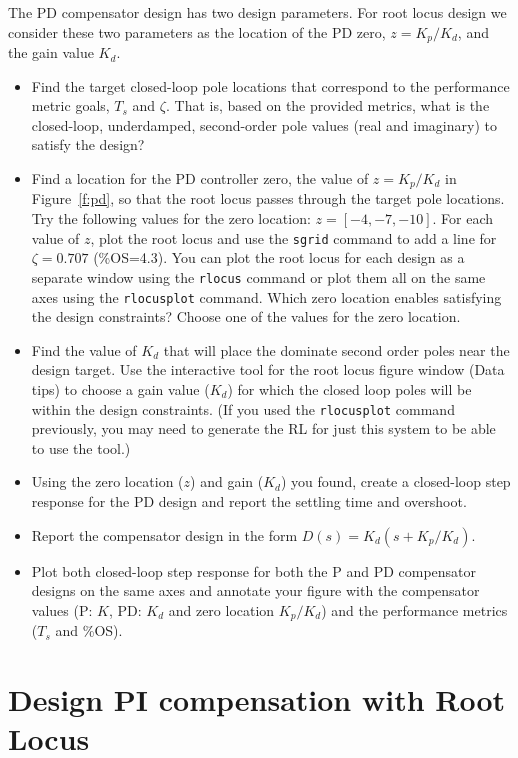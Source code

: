 \documentclass[11pt]{article}
\begin{document}
The PD compensator design has two design parameters.   For root locus design we consider these two parameters as the location of the PD zero, $z = K_p/K_d$, and the gain value $K_d$.
\begin{itemize}
\item Find the target closed-loop pole locations that correspond to the performance metric goals, $T_s$ and $\zeta$.  That is, based on the provided metrics, what is the closed-loop, underdamped, second-order pole values (real and imaginary) to satisfy the design?  
\item Find a location for the PD controller zero, the value of $z = K_p/K_d$ in Figure~\ref{f:pd}, so that the root locus passes through the target pole locations.  Try the following values for the zero location: $z = [-4, -7, -10]$.  For each value of $z$, plot the root locus and use the \texttt{sgrid} command to add a line for $\zeta=0.707$ (\%OS=4.3).  You can plot the root locus for each design as a separate window using the \texttt{rlocus} command or plot them all on the same axes using the \texttt{rlocusplot} command.  Which zero location enables satisfying the design constraints?  Choose one of the values for the zero location.
\item Find the value of $K_d$ that will place the dominate second order poles near the design target.  Use the interactive tool for the root locus figure window (Data tips) to choose a gain value ($K_d$) for which the closed loop poles will be within the design constraints. (If you used the \texttt{rlocusplot} command previously, you may need to generate the RL for just this system to be able to use the tool.)  
\item Using the zero location ($z$) and gain ($K_d$) you found, create a closed-loop step response for the PD design and report the settling time and overshoot.
\item Report the compensator design in the form $D(s) = K_d (s + K_p/K_d)$.
  \item Plot both closed-loop step response for both the P and PD compensator designs on the same axes and annotate your figure with the compensator values (P: $K$, PD: $K_d$ and zero location $K_p/K_d$) and the performance metrics ($T_s$ and \%OS).
\end{itemize}



\section{Design PI compensation with Root Locus}
\end{document}

